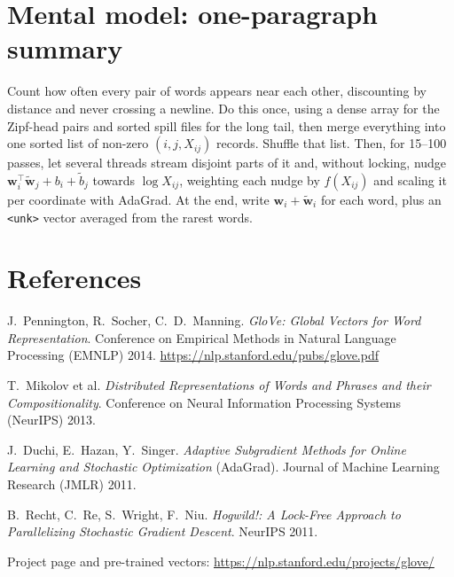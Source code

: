 \documentclass[11pt,a4paper]{article}
\newcommand{\wv}{\mathbf{w}}
\newcommand{\cv}{\tilde{\mathbf{w}}}
\begin{document}
\section{Mental model: one-paragraph summary}

\begin{tcolorbox}[colback=gray!4,colframe=gray!50!black,title=\textbf{GloVe in one paragraph}]
Count how often every pair of words appears near each other, discounting by distance and
never crossing a newline. Do this once, using a dense array for the Zipf-head pairs and
sorted spill files for the long tail, then merge everything into one sorted list of
non-zero $(i,j,X_{ij})$ records. Shuffle that list. Then, for 15--100 passes, let several
threads stream disjoint parts of it and, without locking, nudge
$\wv_i^\top\cv_j+b_i+\tilde b_j$ towards $\log X_{ij}$, weighting each nudge by
$f(X_{ij})$ and scaling it per coordinate with AdaGrad. At the end, write
$\wv_i+\cv_i$ for each word, plus an \texttt{<unk>} vector averaged from the rarest words.
\end{tcolorbox}

\section*{References}
\begin{enumerate}[label={[\arabic*]},leftmargin=2em]
  \item J.~Pennington, R.~Socher, C.~D.~Manning. \emph{GloVe: Global Vectors for Word
        Representation}. Conference on Empirical Methods in Natural Language Processing (EMNLP) 2014. \url{https://nlp.stanford.edu/pubs/glove.pdf}
  \item T.~Mikolov et al. \emph{Distributed Representations of Words and Phrases and their
        Compositionality}. Conference on Neural Information Processing Systems (NeurIPS) 2013.
  \item J.~Duchi, E.~Hazan, Y.~Singer. \emph{Adaptive Subgradient Methods for Online
        Learning and Stochastic Optimization} (AdaGrad). Journal of Machine Learning Research (JMLR) 2011.
  \item B.~Recht, C.~Re, S.~Wright, F.~Niu. \emph{Hogwild!: A Lock-Free Approach to
        Parallelizing Stochastic Gradient Descent}. NeurIPS 2011.
  \item Project page and pre-trained vectors: \url{https://nlp.stanford.edu/projects/glove/}
\end{enumerate}
\end{document}
